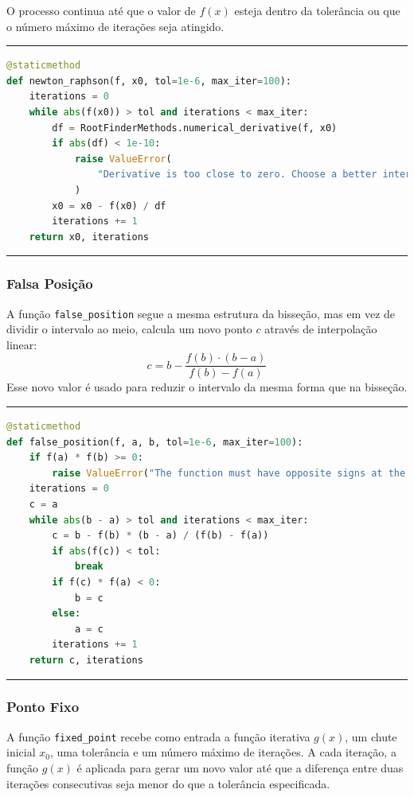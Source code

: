 O processo continua até que o valor de \( f(x) \) esteja dentro da tolerância ou
que o número máximo de iterações seja atingido.

\hrule
\lstset{style=mystyle}
\begin{lstlisting}[language=Python]
@staticmethod
def newton_raphson(f, x0, tol=1e-6, max_iter=100):
    iterations = 0
    while abs(f(x0)) > tol and iterations < max_iter:
        df = RootFinderMethods.numerical_derivative(f, x0)
        if abs(df) < 1e-10:
            raise ValueError(
                "Derivative is too close to zero. Choose a better interval or initial guess."
            )
        x0 = x0 - f(x0) / df
        iterations += 1
    return x0, iterations
\end{lstlisting}
\hrule

\subsubsection{Falsa Posição}

A função \texttt{false\_position} segue a mesma estrutura da bisseção, mas em
vez de dividir o intervalo ao meio, calcula um novo ponto \( c \) através de
interpolação linear:
\[
	c = b - \frac{f(b) \cdot (b - a)}{f(b) - f(a)}
\]
Esse novo valor é usado para reduzir o intervalo da mesma forma que na bisseção.

\hrule
\lstset{style=mystyle}
\begin{lstlisting}[language=Python]
@staticmethod
def false_position(f, a, b, tol=1e-6, max_iter=100):
    if f(a) * f(b) >= 0:
        raise ValueError("The function must have opposite signs at the endpoints.")
    iterations = 0
    c = a
    while abs(b - a) > tol and iterations < max_iter:
        c = b - f(b) * (b - a) / (f(b) - f(a))
        if abs(f(c)) < tol:
            break
        if f(c) * f(a) < 0:
            b = c
        else:
            a = c
        iterations += 1
    return c, iterations
\end{lstlisting}
\hrule

\subsubsection{Ponto Fixo}

A função \texttt{fixed\_point} recebe como entrada a função iterativa \( g(x)
\), um chute inicial \( x_0 \), uma tolerância e um número máximo de iterações.
A cada iteração, a função \( g(x) \) é aplicada para gerar um novo valor até que
a diferença entre duas iterações consecutivas seja menor do que a tolerância
especificada.

